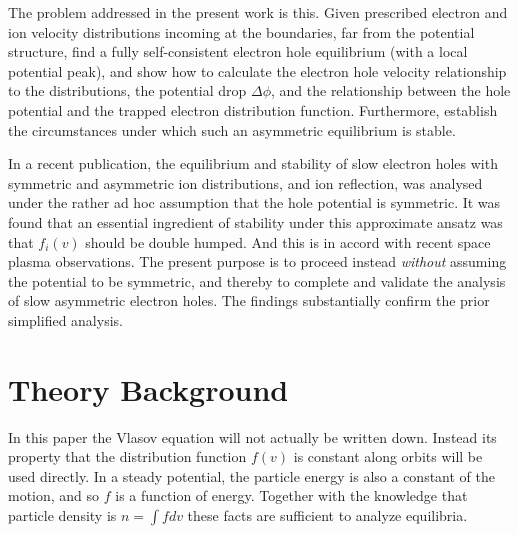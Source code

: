 \documentclass[12pt]{article}
\begin{document}
The problem addressed in the present work is this. Given prescribed
electron and ion velocity distributions incoming at the boundaries,
far from the potential structure, find a fully self-consistent
electron hole equilibrium (with a local potential peak), and show how
to calculate the electron hole velocity relationship to the
distributions, the potential drop $\Delta\phi$, and the relationship
between the hole potential and the trapped electron distribution
function. Furthermore, establish the circumstances under which such an
asymmetric equilibrium is stable.

In a recent publication\cite{Hutchinson2021c}, the equilibrium and
stability of slow electron holes with symmetric and asymmetric ion
distributions, and ion reflection, was analysed under the rather ad
hoc assumption that the hole potential is symmetric. It was found that
an essential ingredient of stability under this approximate ansatz was
that $f_i(v)$ should be double humped. And this is in accord with
recent space plasma observations\cite{Kamaletdinov2021}. The present
purpose is to proceed instead \emph{without} assuming the potential to
be symmetric, and thereby to complete and validate the analysis
of slow asymmetric electron holes. The findings substantially confirm
the prior simplified analysis.

\section{Theory Background}

In this paper the Vlasov equation will not actually be written
down. Instead its property that the distribution function $f(v)$ is
constant along orbits will be used directly. In a steady potential,
the particle energy is also a constant of the motion, and so $f$ is a
function of energy. Together with the knowledge that particle density
is $n=\int f dv$ these facts are sufficient to analyze equilibria.
\end{document}
